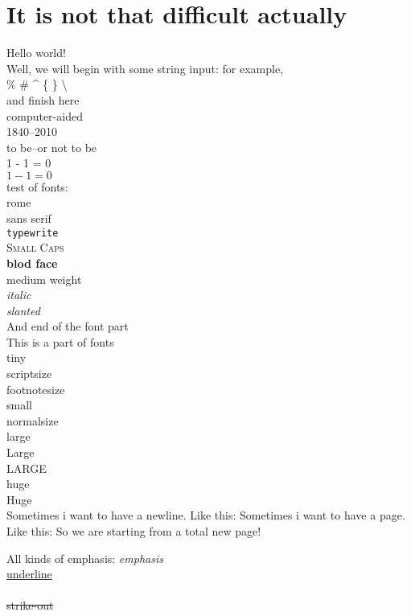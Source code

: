 \documentclass{report} %
\begin{document}
\chapter{It is not that difficult actually}
Hello world!\\
Well, we will begin with some string input: for example,\\ 
\% \# \^ \* \{ \} \textbackslash \\
and finish here\\
computer-aided\\
1840--2010\\
to be--or not to be\\
1 - 1 = 0\\
$1 - 1 = 0$\\
test of fonts:\\
\textrm{rome}\\
\textsf{sans serif}\\
\texttt{typewrite}\\
\textsc{Small Caps}\\
\textbf{blod face}\\
\textmd{medium weight}\\
\textit{italic}\\
\textsl{slanted}\\
And end of the font part\\
This is a part of fonts\\
\tiny{tiny}\\
\scriptsize{scriptsize}\\
\footnotesize{footnotesize}\\
\small{small}\\
\normalsize{normalsize}\\
\large{large}\\
\Large{Large}\\
\LARGE{LARGE}\\
\huge{huge}\\
\Huge{Huge}\\

\normalsize
Sometimes i want to have a newline. Like this:
\newline
Sometimes i want to have a page. Like this:
\newpage
So we are starting from a total new page!


All kinds of emphasis:
\emph{emphasis}\\
\uline{underline}\\
\\
\sout{strike-out}




\listoffigures 
\listoftables
\end{document}
